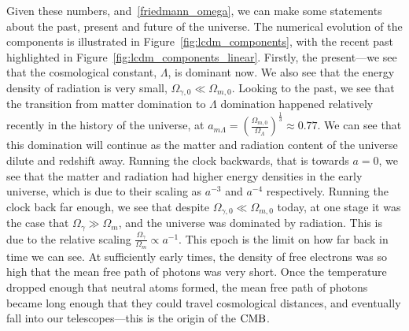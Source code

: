     Given these numbers, and~\eqref{friedmann_omega}, we can make some statements
    about the past, present and future of the universe.
    The numerical evolution of the components is illustrated in Figure~\ref{fig:lcdm_components},
    with the recent past highlighted in Figure~\ref{fig:lcdm_components_linear}.
    Firstly, the present---we see that the cosmological constant,
    $\Lambda$, is dominant now. We also see that the energy density of radiation
    is very small, $\Omega_{\gamma,0}\ll\Omega_{m,0}$.
    Looking to the past, we see that the transition from matter domination
    to $\Lambda$ domination happened relatively recently in the history of the universe,
    at $a_{m\Lambda}=\left(\frac{\Omega_{m,0}}{\Omega_{\Lambda}}\right)^{\frac{1}{3}}\approx0.77$.
    We can see that this domination will continue as the matter and radiation content of the
    universe dilute and redshift away.
    Running the clock backwards, that is towards $a=0$, we see that the matter and radiation had
    higher energy densities in the early universe, which is due to their scaling as $a^{-3}$ and $a^{-4}$
    respectively.
    Running the clock back far enough, we see
    that despite $\Omega_{\gamma,0}\ll\Omega_{m,0}$ today, at one stage it was the
    case that $\Omega_{\gamma}\gg\Omega_{m}$, and the universe was dominated by radiation.
    This is due to the relative scaling $\frac{\Omega_{\gamma}}{\Omega_{m}}\propto a^{-1}$.
    This epoch is the limit on how far back in time we can see.
    At sufficiently early times, the density of free electrons
    was so high that the mean free path of photons was very short. Once the temperature
    dropped enough that neutral atoms formed, the mean free path of photons became long
    enough that they could travel cosmological distances, and eventually fall into our telescopes---this
    is the origin of the $\text{CMB}$.
